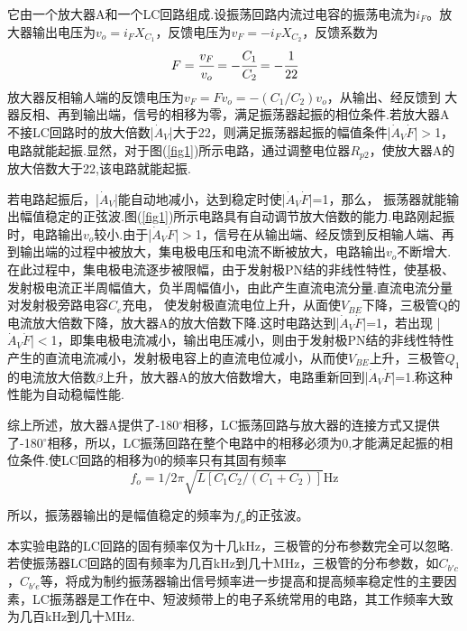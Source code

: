 \documentclass[a4paper]{article}
\begin{document}
它由一个放大器A和一个LC回路组成.设振荡回路内流过电容的振荡电流为$i_F$。放大器输出电压为$v_o = i_FX_{C_1}$，反馈电压为$v_F = -i_FX_{C_2}$，反馈系数为
\begin{equation}
F = \cfrac{v_F}{v_o} = -\cfrac{C_1}{C_2} = -\cfrac{1}{22}\label{eq1}
\end{equation}
放大器反相输人端的反馈电压为$v_F = Fv_o = -(C_1/C_2)v_o$，从输出、经反馈到 大器反相、再到输出端，信号的相移为零，满足振荡器起振的相位条件.若放大器A不接LC回路时的放大倍数|$\dot{A}_V$|大于22，则满足振荡器起振的幅值条件|$\dot{A}_V\dot{F}$|$>$1，电路就能起振.显然，对于图(\ref{fig1})所示电路，通过调整电位器$R_{p2}$，使放大器A的放大倍数大于22,该电路就能起振.

若电路起振后，|$\dot{A}_V$|能自动地减小，达到稳定时使|$\dot{A}_V\dot{F}$|=1，那么，
振荡器就能输出幅值稳定的正弦波.图(\ref{fig1})所示电路具有自动调节放大倍数的能力.电路刚起振时，电路输出$v_o$较小.由于|$\dot{A}_V\dot{F}$|$>$1，信号在从输出端、经反馈到反相输人端、再到输出端的过程中被放大，集电极电压和电流不断被放大，电路输出$v_o$不断增大.在此过程中，集电极电流逐步被限幅，由于发射极PN结的非线性特性，使基极、发射极电流正半周幅值大，负半周幅值小，由此产生直流电流分量.直流电流分量对发射极旁路电容$C_e$充电， 使发射极直流电位上升，从面使$V_{BE}$下降，三极管Q的电流放大倍数下降，放大器A的放大倍数下降.这时电路达到|$\dot{A}_V\dot{F}$|=1，若出现
|$\dot{A}_V\dot{F}$|$<$1，即集电极电流减小，输出电压减小，则由于发射极PN结的非线性特性产生的直流电流减小，发射极电容上的直流电位减小，从而使$V_{BE}$上升，三极管$Q_1$的电流放大倍数$\beta$上升，放大器A的放大倍数增大，电路重新回到|$\dot{A}_V\dot{F}$|=1.称这种性能为自动稳幅性能.

综上所述，放大器A提供了-180$^{\circ}$相移，LC振荡回路与放大器的连接方式又提供了-180$^{\circ}$相移，所以，LC振荡回路在整个电路中的相移必须为0,才能满足起振的相位条件.使LC回路的相移为0的频率只有其固有频率
\begin{equation}
f_o = 1/2\pi\sqrt{L[C_1C_2/(C_1+C_2)]}\text{Hz}\label{eq2}
\end{equation}

所以，振荡器输出的是幅值稳定的频率为$f_o$的正弦波。

本实验电路的LC回路的固有频率仅为十几kHz，三极管的分布参数完全可以忽略.若使振荡器LC回路的固有频率为几百kHz到几十MHz，三极管的分布参数，如$C_{b'c}$，$C_{b'e}$等，将成为制约振荡器输出信号频率进一步提高和提高频率稳定性的主要因素，LC振荡器是工作在中、短波频带上的电子系统常用的电路，其工作频率大致为几百kHz到几十MHz.
\end{document}
